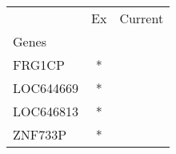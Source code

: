 \begin{tabular}{lcc}
\toprule
{} & Ex & Current \\
Genes     &    &         \\
\midrule
FRG1CP    &  * &         \\
LOC644669 &  * &         \\
LOC646813 &  * &         \\
ZNF733P   &  * &         \\
\bottomrule
\end{tabular}
